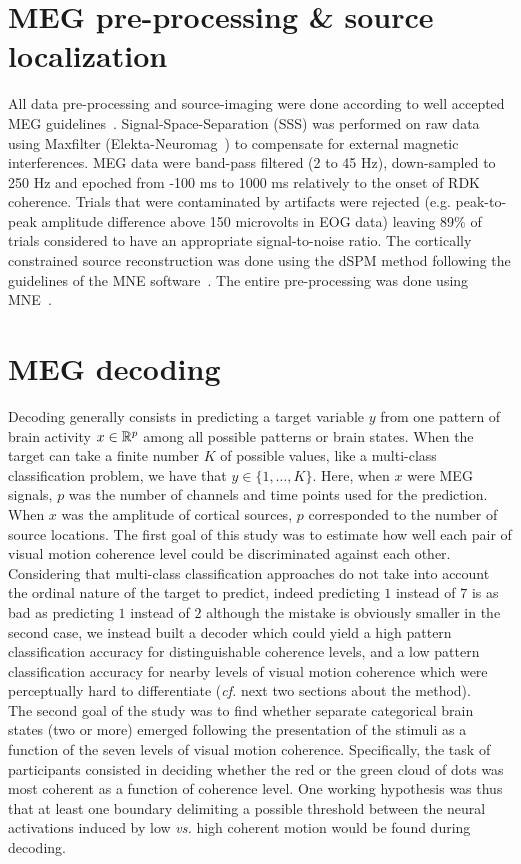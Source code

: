 \section{MEG pre-processing \& source localization}
All data pre-processing and source-imaging were done according to well accepted MEG guidelines~\cite{42gross2013good}. Signal-Space-Separation (SSS) was performed on raw data using Maxfilter (Elekta-Neuromag~\cite{43taulu2006spatiotemporal}) to compensate for external magnetic interferences. MEG data were band-pass filtered (2 to 45 Hz), down-sampled to 250 Hz and epoched from -100 ms to 1000 ms relatively to the onset of RDK coherence. Trials that were contaminated by artifacts were rejected (e.g. peak-to-peak amplitude difference above 150 microvolts in EOG data) leaving 89\% of trials considered to have an appropriate signal-to-noise ratio. The cortically constrained source reconstruction was done using the dSPM method following the guidelines of the MNE software~\cite{44gramfort2014mne}. The entire pre-processing was done using MNE~\cite{45gramfort2013meg}.

\section{MEG decoding}
Decoding generally consists in predicting a target variable $y$
from one pattern of brain activity $x\in\mathbb{R}^p$ among all possible patterns or brain states.
When the target can take a finite number $K$ of possible values, like a multi-class classification problem, we have that $y \in\{1,\dots,K\}$. Here, when $x$ were MEG signals, $p$ was the number of channels and time points used for the prediction.
When $x$ was the amplitude of cortical sources, $p$ corresponded to the number of source locations.
The first goal of this study was to estimate how well each pair of visual motion coherence level could be discriminated against each other. Considering that multi-class classification approaches do not take into account the ordinal nature of the target to predict, indeed predicting $1$ instead of $7$ is as bad as predicting $1$ instead of $2$ although the mistake is obviously smaller in the second case, we instead built a decoder which could yield a high pattern classification accuracy for distinguishable coherence levels, and a low pattern classification accuracy for nearby levels of visual motion coherence which were perceptually hard to differentiate (\textit{cf.} next two sections about the method).\\
The second goal of the study was to find whether separate categorical brain states (two or more) emerged following the presentation of the stimuli as a function of the seven levels of visual motion coherence. Specifically, the task of participants consisted in deciding whether the red or the green cloud of dots was most coherent as a function of coherence level. One working hypothesis was thus that at least one boundary delimiting a possible threshold between the neural activations induced by low \textit{vs.} high coherent motion would be found during decoding.

